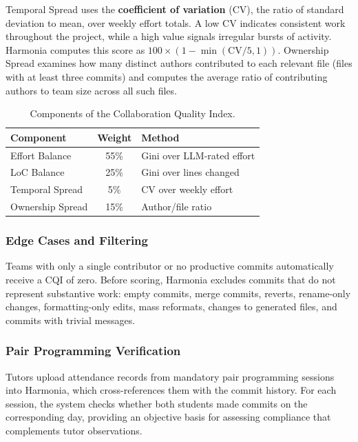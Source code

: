 \documentclass[sigconf]{acmart}
\begin{document}
Temporal Spread uses the \textbf{coefficient of variation} (CV), the ratio of standard deviation to mean, over weekly effort totals. A low CV indicates consistent work throughout the project, while a high value signals irregular bursts of activity. Harmonia computes this score as $100 \times (1 - \min(\text{CV} / 5, 1))$. Ownership Spread examines how many distinct authors contributed to each relevant file (files with at least three commits) and computes the average ratio of contributing authors to team size across all such files.

\begin{table}[h]
  \caption{Components of the Collaboration Quality Index.}
  \label{tab:cqi-components}
  \small
  \begin{tabular}{@{}lcl@{}}
    \toprule
    \textbf{Component} & \textbf{Weight} & \textbf{Method} \\
    \midrule
    Effort Balance  & 55\% & Gini over LLM-rated effort \\
    LoC Balance     & 25\% & Gini over lines changed \\
    Temporal Spread &  5\% & CV over weekly effort \\
    Ownership Spread& 15\% & Author/file ratio \\
    \bottomrule
  \end{tabular}
\end{table}

\subsubsection{Edge Cases and Filtering}

Teams with only a single contributor or no productive commits automatically receive a CQI of zero. Before scoring, Harmonia excludes commits that do not represent substantive work: empty commits, merge commits, reverts, rename-only changes, formatting-only edits, mass reformats, changes to generated files, and commits with trivial messages.

\subsubsection{Pair Programming Verification}
\label{sec:pp}

Tutors upload attendance records from mandatory pair programming sessions into Harmonia, which cross-references them with the commit history. For each session, the system checks whether both students made commits on the corresponding day, providing an objective basis for assessing compliance that complements tutor observations.
\end{document}
